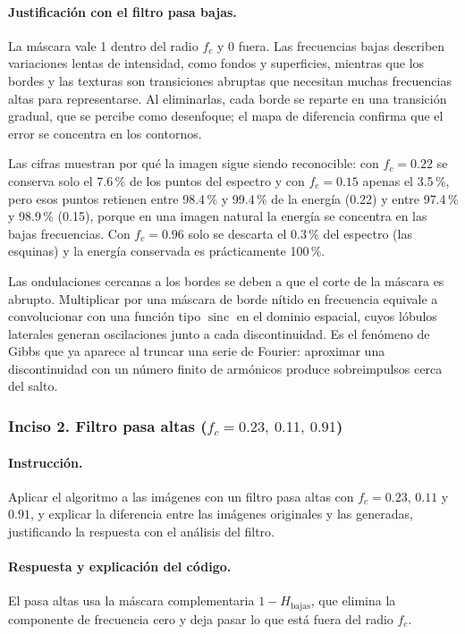 \documentclass[11pt]{article}
\begin{document}
\paragraph{Justificación con el filtro pasa bajas.}
La máscara vale 1 dentro del radio $f_c$ y 0 fuera. Las frecuencias bajas describen variaciones lentas de intensidad,
como fondos y superficies, mientras que los bordes y las texturas son transiciones abruptas que necesitan muchas frecuencias
altas para representarse. Al eliminarlas, cada borde se reparte en una transición gradual, que se percibe como desenfoque;
el mapa de diferencia confirma que el error se concentra en los contornos.

Las cifras muestran por qué la imagen sigue siendo reconocible: con $f_c=0.22$ se conserva solo el 7.6\,\% de los puntos del
espectro y con $f_c=0.15$ apenas el 3.5\,\%, pero esos puntos retienen entre 98.4\,\% y 99.4\,\% de la energía (0.22) y entre
97.4\,\% y 98.9\,\% (0.15), porque en una imagen natural la energía se concentra en las bajas frecuencias. Con $f_c=0.96$ solo
se descarta el 0.3\,\% del espectro (las esquinas) y la energía conservada es prácticamente 100\,\%.

Las ondulaciones cercanas a los bordes se deben a que el corte de la máscara es abrupto. Multiplicar por una máscara de borde
nítido en frecuencia equivale a convolucionar con una función tipo $\operatorname{sinc}$ en el dominio espacial, cuyos
lóbulos laterales generan oscilaciones junto a cada discontinuidad. Es el fenómeno de Gibbs que ya aparece al truncar una serie de
Fourier: aproximar una discontinuidad con un número finito de armónicos produce sobreimpulsos cerca del salto.



\FloatBarrier
\subsubsection*{Inciso 2. Filtro pasa altas ($f_c=0.23,\ 0.11,\ 0.91$)}

\paragraph{Instrucción.}
Aplicar el algoritmo a las imágenes con un filtro pasa altas con $f_c=0.23$, $0.11$ y $0.91$, y explicar la diferencia entre las
imágenes originales y las generadas, justificando la respuesta con el análisis del filtro.

\paragraph{Respuesta y explicación del código.}
El pasa altas usa la máscara complementaria $1-H_{\text{bajas}}$, que elimina la componente de frecuencia cero y deja
pasar lo que está fuera del radio $f_c$.
\end{document}
